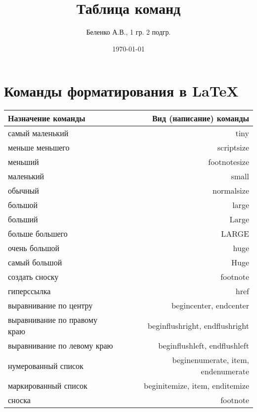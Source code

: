 \documentclass[a4paper,12pt]{article} %
\author{Беленко А.В., 1 гр. 2 подгр.} %
\title{Таблица команд} %
\date{\today} %
\begin{document}
\maketitle
\newpage
\section*{Команды форматирования в \LaTeX}
\begin{tabular}{ l | r }
  \textbf{Назначение команды} & \textbf{Вид (написание) команды} \\ \hline
  самый маленький			  & tiny \\ \hline
  меньше меньшего			  & scriptsize \\ \hline
  меньший					  & footnotesize \\ \hline
  маленький					  & small \\ \hline
  обычный					  & normalsize \\ \hline
  большой					  & large \\ \hline
  больший					  & Large \\ \hline
  больше большего			  & LARGE \\ \hline
  очень большой				  & huge \\ \hline
  самый большой				  & Huge \\ \hline
  создать сноску			  & footnote \\ \hline
  гиперссылка				  & href \\ \hline
  выравнивание по центру	  & begin{center}, end{center} \\ \hline
  выравнивание по правому краю & begin{flushright}, end{flushright} \\ \hline
  выравнивание по левому краю & begin{flushleft}, end{flushleft} \\ \hline
  нумерованный список 		  & begin{enumerate}, item, end{enumerate} \\ \hline
  маркированный список		  & begin{itemize}, item, end{itemize} \\ \hline
  сноска					  & footnote
\end{tabular}
\end{document}
